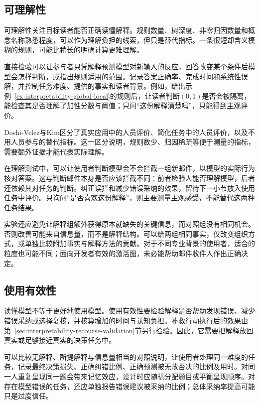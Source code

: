 \subsection{可理解性}
\label{sec:interpretability-quality-comprehensibility}

可理解性关注目标读者能否正确读懂解释。规则数量、树深度、非零归因数量和概念名称熟悉程度，可以作为理解负担的线索，但只是替代指标。一条很短却含义模糊的规则，可能比稍长的明确计算更难理解。

直接检验可以让参与者只凭解释预测模型对新输入的反应，回答改变某个条件后模型会怎样判断，或指出规则适用的范围。记录答案正确率、完成时间和系统性误解，并控制任务难度、提供的事实和读者背景。例如，给出示例~\ref{ex:interpretability-global-local}的规则后，让读者判断$(0,1)$是否会被隔离，能检查其是否理解了加性分数与阈值；只问“这份解释清楚吗”，只能得到主观评价。

Doshi-Velez与Kim区分了真实应用中的人员评价、简化任务中的人员评价，以及不用人员参与的替代指标。这一区分说明，规则数少、归因稀疏等便于测量的指标，需要额外证据才能代表实际理解。

在理解测试中，可以让使用者判断模型会不会拦截一组新邮件，以模型的实际行为核对答案。这与判断邮件本身是否应该拦截不同：前者检验人能否理解模型，后者还依赖其对任务的判断。纠正误拦和减少错误采纳的效果，留待下一小节放入使用任务中评价。只询问“是否喜欢这份解释”，则主要测量主观感受，不能替代这两种任务结果。

实验还应避免让解释组额外获得原本就缺失的关键信息，而对照组没有相同机会。否则改善可能来自信息量，而不是解释结构。可以给两组相同事实，仅改变组织方式，或单独比较附加事实与解释方法的贡献。对于不同专业背景的使用者，适合的粒度也可能不同；面向开发者有效的激活图，未必能帮助邮件收件人作出正确决定。

\subsection{使用有效性}
\label{sec:interpretability-quality-utility}

读懂模型不等于更好地使用模型。使用有效性要检验解释是否帮助发现错误、减少错误采纳或选择复核，并核算增加的时间与认知负担。补救行动执行后的效果由第~\ref{sec:interpretability-recourse-validation}节另行检验。因此，它需要把解释放回真实或足够接近真实的决策任务中。

可以比较无解释、所提解释与信息量相当的对照说明，让使用者处理同一难度的任务，记录最终决策损失、正确纠错比例、正确预测被无故否决的比例及用时。对同一人重复呈现同一题会带来记忆效应，设计时应随机分配题目或平衡呈现顺序。对存在模型错误的任务，还应单独报告错误建议被采纳的比例；总体采纳率提高可能只是过度信任。

